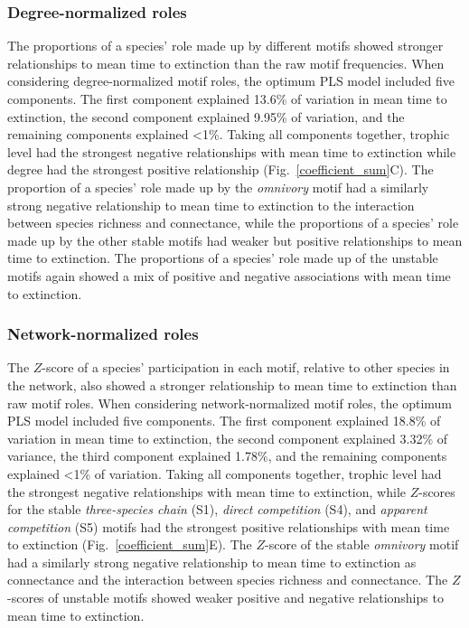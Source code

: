\documentclass[12pt]{article}
\begin{document}
\begin{spacing}{2.0}
        \subsubsection*{Degree-normalized roles}
        
    		The proportions of a species' role made up by different motifs showed stronger relationships to mean time to extinction than the raw motif frequencies.
    		When considering degree-normalized motif roles, the optimum PLS model included five components.
    		The first component explained 13.6\% of variation in mean time to extinction, the second component explained 9.95\% of variation, and the remaining components explained \textless1\%.
            Taking all components together, trophic level had the strongest negative relationships with mean time to extinction while degree had the strongest positive relationship (Fig.~\ref{coefficient_sum}C).
            The proportion of a species' role made up by the \emph{omnivory} motif had a similarly strong negative relationship to mean time to extinction to the interaction between species richness and connectance, while the proportions of a species' role made up by the other stable motifs had weaker but positive relationships to mean time to extinction.
            The proportions of a species' role made up of the unstable motifs again showed a mix of positive and negative associations with mean time to extinction.

        \subsubsection*{Network-normalized roles}
        
    		The $Z$-score of a species' participation in each motif, relative to other species in the network, also showed a stronger relationship to mean time to extinction than raw motif roles.
    		When considering network-normalized motif roles, the optimum PLS model included five components.
    		The first component explained 18.8\% of variation in mean time to extinction, the second component explained 3.32\% of variance, the third component explained 1.78\%, and the remaining components explained \textless1\% of variation.
    		Taking all components together, trophic level had the strongest negative relationships  with mean time to extinction, while $Z$-scores for the stable \emph{three-species chain} (S1), \emph{direct competition} (S4), and \emph{apparent competition} (S5) motifs had the strongest positive relationships with mean time to extinction (Fig.~\ref{coefficient_sum}E). 
    		The $Z$-score of the stable \emph{omnivory} motif had a similarly strong negative relationship to mean time to extinction as connectance and the interaction between species richness and connectance.
    		The $Z$-scores of unstable motifs showed weaker positive and negative relationships to mean time to extinction.
    		


\end{spacing}
\end{document}
